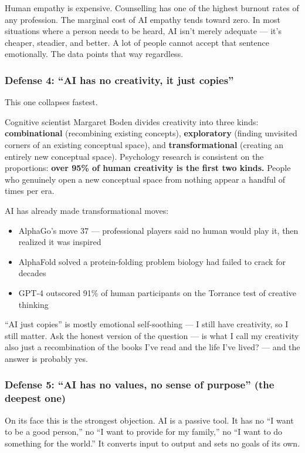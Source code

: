 \documentclass[11pt,a4paper]{article}
\begin{document}
Human empathy is expensive. Counselling has one of the highest burnout rates of any profession. The marginal cost of AI empathy tends toward zero. In most situations where a person needs to be heard, AI isn't merely adequate --- it's cheaper, steadier, and better. A lot of people cannot accept that sentence emotionally. The data points that way regardless.

\subsubsection{Defense 4: ``AI has no creativity, it just copies''}

This one collapses fastest.

Cognitive scientist Margaret Boden divides creativity into three kinds: \textbf{combinational} (recombining existing concepts), \textbf{exploratory} (finding unvisited corners of an existing conceptual space), and \textbf{transformational} (creating an entirely new conceptual space). Psychology research is consistent on the proportions: \textbf{over 95\% of human creativity is the first two kinds.} People who genuinely open a new conceptual space from nothing appear a handful of times per era.

AI has already made transformational moves:

\begin{itemize}
  \item AlphaGo's move 37 --- professional players said no human would play it, then realized it was inspired
  \item AlphaFold solved a protein-folding problem biology had failed to crack for decades
  \item GPT-4 outscored 91\% of human participants on the Torrance test of creative thinking
\end{itemize}

``AI just copies'' is mostly emotional self-soothing --- I still have creativity, so I still matter. Ask the honest version of the question --- is what I call my creativity also just a recombination of the books I've read and the life I've lived? --- and the answer is probably yes.

\subsubsection{Defense 5: ``AI has no values, no sense of purpose'' (the deepest one)}

On its face this is the strongest objection. AI is a passive tool. It has no ``I want to be a good person,'' no ``I want to provide for my family,'' no ``I want to do something for the world.'' It converts input to output and sets no goals of its own.
\end{document}
